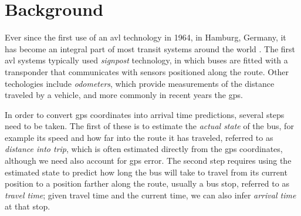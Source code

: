 \documentclass[12pt,a4paper]{article}
\begin{document}






\section{Background}
\label{sec:background}

Ever since the first use of an \gls{avl} technology in 1964, in Hamburg, Germany,
it has become an integral part of most transit systems around the world
\citep{tcrp:1997,tcrp:2003}.
The first \gls{avl} systems typically used \emph{signpost} technology,
in which buses are fitted with a transponder that communicates with 
sensors positioned along the route.
Other techologies include \emph{odometers},
which provide measurements of the distance traveled by a vehicle,
and more commonly in recent years the \gls{gps}.


In order to convert \gls{gps} coordinates into arrival time predictions,
several steps need to be taken.
The first of these is to estimate the \emph{actual state} of the bus,
for example its speed and how far into the route it has traveled,
referred to as \emph{distance into trip},
which is often estimated directly from the \gls{gps} coordinates,
although we need also account for \gls{gps} error.
The second step requires using the estimated state
to predict how long the bus will take to travel from its current position
to a position farther along the route, usually a bus stop,
referred to as \emph{travel time};
given travel time and the current time, we can also infer \emph{arrival time} at that stop.
\end{document}
